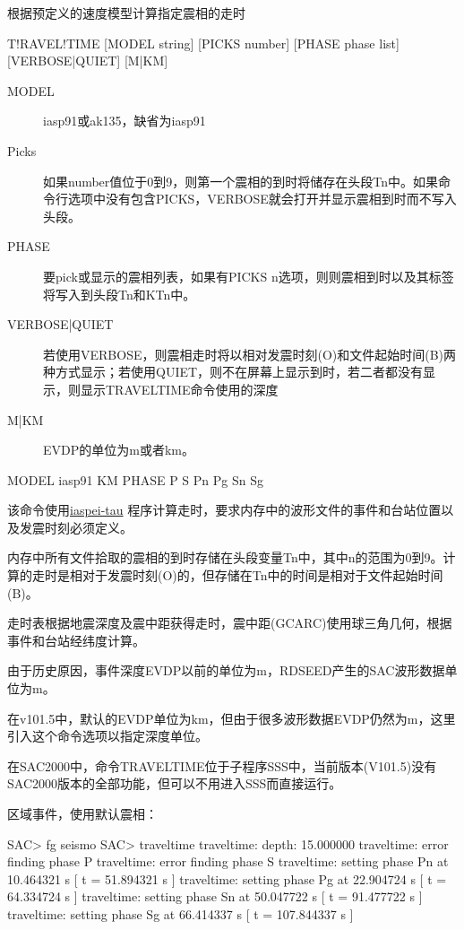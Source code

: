 \label{cmd:traveltime}

根据预定义的速度模型计算指定震相的走时

\begin{SACSTX}
T!RAVEL!TIME [MODEL string] [PICKS number] [PHASE phase list] 
    [VERBOSE|QUIET] [M|KM]
\end{SACSTX}

\begin{description}
\item [MODEL] iasp91或ak135，缺省为iasp91
\item [Picks] 如果number值位于0到9，则第一个震相的到时将储存在头段Tn中。如果命令行选项中没有包含PICKS，VERBOSE就会打开并显示震相到时而不写入头段。
\item [PHASE] 要pick或显示的震相列表，如果有PICKS n选项，则则震相到时以及其标签将写入到头段Tn和KTn中。 
\item [VERBOSE|QUIET] 若使用VERBOSE，则震相走时将以相对发震时刻(O)和文件起始时间(B)两种方式显示；若使用QUIET，则不在屏幕上显示到时，若二者都没有显示，则显示TRAVELTIME命令使用的深度 
\item [M|KM] EVDP的单位为m或者km。
\end{description}

\begin{SACDFT}
MODEL iasp91 KM PHASE P S Pn Pg Sn Sg
\end{SACDFT}

该命令使用\href{http://www.iris.edu/software/downloads/processing/}{iaspei-tau}
程序计算走时，要求内存中的波形文件的事件和台站位置以及发震时刻必须定义。

内存中所有文件拾取的震相的到时存储在头段变量Tn中，其中n的范围为0到9。计算的走时是相对于发震时刻(O)的，但存储在Tn中的时间是相对于文件起始时间(B)。

走时表根据地震深度及震中距获得走时，震中距(GCARC)使用球三角几何，根据事件和台站经纬度计算。

由于历史原因，事件深度EVDP以前的单位为m，RDSEED产生的SAC波形数据单位为m。

在v101.5中，默认的EVDP单位为km，但由于很多波形数据EVDP仍然为m，这里引入这个命令选项以指定深度单位。

在SAC2000中，命令TRAVELTIME位于子程序SSS中，当前版本(V101.5)没有SAC2000版本的全部功能，但可以不用进入SSS而直接运行。

区域事件，使用默认震相：
\begin{SACCode}
SAC> fg seismo
SAC> traveltime 
traveltime: depth: 15.000000
traveltime: error finding phase P       
traveltime: error finding phase S       
traveltime: setting phase Pn       at 10.464321 s [ t = 51.894321 s ]
traveltime: setting phase Pg       at 22.904724 s [ t = 64.334724 s ]
traveltime: setting phase Sn       at 50.047722 s [ t = 91.477722 s ]
traveltime: setting phase Sg      at 66.414337 s [ t = 107.844337 s ]
\end{SACCode} 

